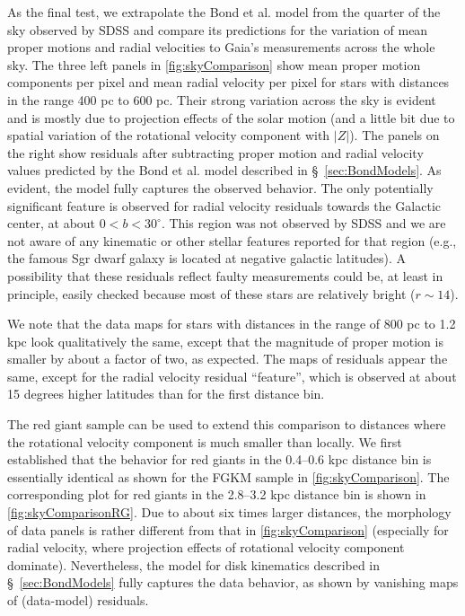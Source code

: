 As the final test, we extrapolate the Bond et al. model from the quarter of the sky observed by SDSS and compare its predictions for
the variation of mean proper motions and radial velocities to Gaia's measurements across the whole sky. The three left panels in
\autoref{fig:skyComparison} show mean proper motion components per pixel and mean radial velocity per pixel for stars with
distances in the range 400 pc to 600 pc. Their strong variation across the sky is evident and is mostly due to projection effects of the
solar motion (and a little bit due to spatial variation of the rotational velocity component with $|Z|$). The panels on the right
show residuals after subtracting proper motion and radial velocity values predicted by the Bond et al. model described in \S~\ref{sec:BondModels}.
As evident, the model fully captures the observed behavior. The only potentially significant feature is observed for radial velocity residuals towards the Galactic
center, at about $0 < b < 30^\circ$. This region was not observed by SDSS and we are not aware of any kinematic or other stellar features
reported for that region (e.g., the famous Sgr dwarf galaxy is located at negative galactic latitudes). A possibility that these residuals
reflect faulty measurements could be, at least in principle, easily checked because most of these stars are relatively bright ($r\sim14$). 

We note that the data maps for stars with distances in the range of 800 pc to 1.2 kpc look qualitatively the same, except that the magnitude
of proper motion is smaller by about a factor of two, as expected. The maps of residuals appear the same, except for the radial velocity
residual ``feature'', which is observed at about 15 degrees higher latitudes than for the first distance bin.

The red giant sample can be used to extend this comparison to distances where the rotational velocity component is much
smaller than locally. We first established that the behavior for red giants in the 0.4--0.6 kpc distance bin is essentially identical
as shown for the FGKM sample in \autoref{fig:skyComparison}. The corresponding plot for red giants in the 2.8--3.2 kpc distance bin 
is shown in \autoref{fig:skyComparisonRG}. Due to about six times larger distances,  the morphology of data panels is rather different
from that in \autoref{fig:skyComparison} (especially for radial velocity, where projection effects of rotational velocity component
dominate). Nevertheless, the model for disk kinematics described in
\S~\ref{sec:BondModels} fully captures the data behavior, as shown by vanishing maps of (data-model) residuals. 

